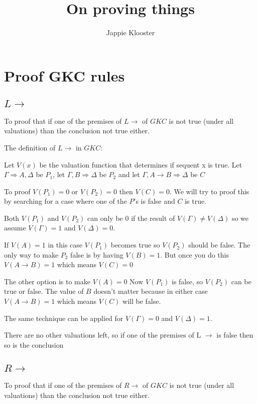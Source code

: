 \documentclass{article}
\newenvironment{scprooftree}[1]%
{\gdef\scalefactor{#1}\begin{center}\proofSkipAmount \leavevmode}%
{\scalebox{\scalefactor}{\DisplayProof}\proofSkipAmount \end{center} }
\begin{document}
\author{Jappie Klooster}
\title{On proving things}
\maketitle

\section{Proof GKC rules}
\subsection{$L\to$}
To proof that if one of the premises of $L\to$ of $GKC$ is not true
(under all valuations) than the conclusion not true either.

The definition of $L\to$ in $GKC$:

\begin{scprooftree}{1}
\end{scprooftree}

Let $V(x)$ be the valuation function that determines if sequent x
is true.
Let $\Gamma \Rightarrow A, \Delta$ be $P_1$,
let $\Gamma, B \Rightarrow \Delta$ be $P_2$ and
let $\Gamma, A \to B \Rightarrow \Delta$ be $C$

To proof $V(P_1) = 0$ or
$V(P_2) = 0$ then
$V(C) = 0$. We will try to proof this by searching for a case
where one of the $P$'s is false and $C$ is true.

Both $V(P_1)$ and $V(P_2)$ can only be 0 if the result of
$V(\Gamma) \not= V(\Delta)$
so we assume $V(\Gamma) = 1$ and $V(\Delta) = 0$.

If $V(A) = 1$ in this case $V(P_1)$ becomes true so $V(P_2)$ should be false.
The only way to make $P_2$ false is by having $V(B) = 1$.
But once you do this $V(A \to B) = 1$ which means $V(C) = 0$

The other option is to make $V(A) = 0$ Now $V(P_1)$ is false, so $V(P_2)$ can
be true or false. The value of $B$ doesn't matter because in either case
$V(A \to B) = 1$ which means $V(C)$ will be false.

The same technique can be applied for $V(\Gamma) = 0$ and $V(\Delta) = 1$.

There are no other valuations left, so if one of the premises of L $\to$ is
false then so is the conclusion

\subsection{$R\to$}
To proof that if one of the premises of $R\to$ of $GKC$ is not true
(under all valuations) than the conclusion not true either.
\end{document}
